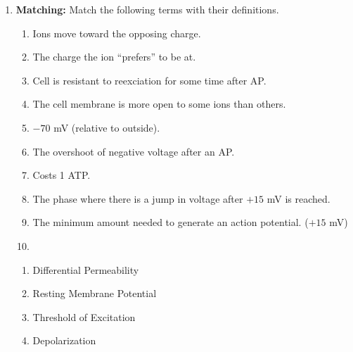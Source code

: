 \begin{enumerate}[label=\textbf{Q2.3.\arabic*}]
      \item \textbf{Matching:} Match the following terms with their definitions.
            \begin{wordbox}
                  \begin{enumerate}
                        \item Ions move toward the opposing charge.
                        \item The charge the ion ``prefers'' to be at.
                        \item Cell is resistant to reexciation for some time after AP.
                        \item The cell membrane is more open to some ions than others.
                        \item \(-70\) mV (relative to outside).
                        \item The overshoot of negative voltage after an AP.
                        \item Costs 1 ATP. 
                        \item The phase where there is a jump in voltage after \(+15\) mV is reached.
                        \item The minimum amount needed to generate an action potential. (\(+15\) mV)
                        \item \underline{\hspace{10cm}} \\
                  \end{enumerate}
            \end{wordbox}
            \begin{enumerate}[label=(\arabic*)]
                  \item Differential Permeability \quad \dotfill \quad \underline{\hspace{1cm}} \\
                  \item Resting Membrane Potential \quad \dotfill \quad \underline{\hspace{1cm}}\\
                  \item Threshold of Excitation \quad \dotfill \quad \underline{\hspace{1cm}}\\
                  \item Depolarization \quad \dotfill \quad \underline{\hspace{1cm}}\\

\end{enumerate}
\end{enumerate}
